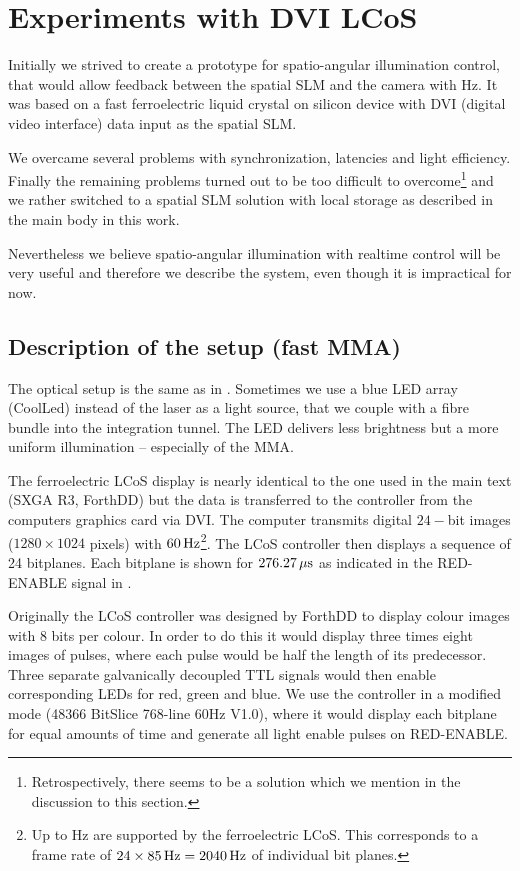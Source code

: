 \chapter{Experiments with DVI LCoS}
\label{sec:dvi}
\begin{summary}
  Initially we strived to create a prototype for spatio-angular
  illumination control, that would allow feedback between the spatial
  SLM and the camera with \unit[60]{Hz}. It was based on a fast
  ferroelectric liquid crystal on silicon device with DVI (digital
  video interface) data input as the spatial SLM.
  
  We overcame several problems with synchronization, latencies and
  light efficiency. Finally the remaining problems turned out to be
  too difficult to overcome\footnote{Retrospectively, there seems to
    be a solution which we mention in the discussion to this section.}
  and we rather switched to a spatial SLM solution with local storage
  as described in the main body in this work.

  Nevertheless we believe spatio-angular illumination with realtime
  control will be very useful and therefore we describe the system,
  even though it is impractical for now.
\end{summary}

\section{Description of the setup (fast MMA)}
The optical setup is the same as in . Sometimes
we use a blue LED array (CoolLed) instead of the laser as a
light source, that we couple with a fibre bundle into the integration
tunnel. The LED delivers less brightness but a more uniform
illumination -- especially of the MMA.

The ferroelectric LCoS display is nearly identical to the one used in
the main text (SXGA R3, ForthDD) but the data is transferred to the
controller from the computers graphics card via DVI. The computer
transmits digital $24-$bit images ($1280\times1024$ pixels) with
$\unit[60]{Hz}$\footnote{Up to \unit[85]{Hz} are supported by the
  ferroelectric LCoS. This corresponds to a frame rate of
  $24\times\unit[85]{Hz}=\unit[2040]{Hz}$ of individual bit
  planes.}. The LCoS controller then displays a sequence of 24
bitplanes. Each bitplane is shown for $\unit[276.27]{\mu s}$ as
indicated in the \textsf{RED-ENABLE} signal in .

Originally the LCoS controller was designed by ForthDD to display
colour images with 8 bits per colour. In order to do this it would
display three times eight images of pulses, where each pulse would be
half the length of its predecessor. Three separate galvanically
decoupled TTL signals would then enable corresponding LEDs for red,
green and blue. We use the controller in a modified mode (48366
BitSlice 768-line 60Hz V1.0), where it would display each bitplane for
equal amounts of time and generate all light enable pulses on
\textsf{RED-ENABLE}.

